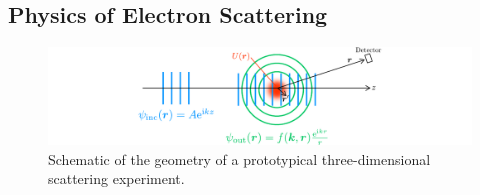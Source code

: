 \subsection{Physics of Electron Scattering}
\label{sec: UED-physics}

\begin{figure}[ht!]
 \centering
 \includegraphics[width = \textwidth]{Figures/fig_ch2_electron-scatter.pdf}
 \caption{
  Schematic of the geometry of a prototypical three-dimensional scattering experiment.
 }
 \label{fig: electron-scatter}
\end{figure}

